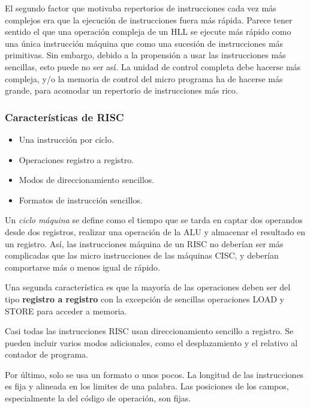 El segundo factor que motivaba repertorios de instrucciones cada vez más complejos era que la ejecución de instrucciones fuera más rápida. Parece tener sentido el que una operación compleja de un HLL se ejecute más rápido como una única instrucción máquina que como una sucesión de instrucciones más primitivas. Sin embargo, debido a la propensión a usar las instrucciones más sencillas, esto puede no ser así. La unidad de control completa debe hacerse más compleja, y/o la memoria de control del micro programa ha de hacerse más grande, para acomodar un repertorio de instrucciones más rico.

\subsubsection*{Características de RISC}

\begin{itemize}
  \item Una instrucción por ciclo.
  \item Operaciones registro a registro.
  \item Modos de direccionamiento sencillos.
  \item Formatos de instrucción sencillos.
\end{itemize}

Un \textit{ciclo máquina} se define como el tiempo que se tarda en captar dos operandos desde dos registros, realizar una operación de la ALU y almacenar el resultado en un registro. Así, las instrucciones máquina de un RISC no deberían ser más complicadas que las micro instrucciones de las máquinas CISC, y deberían comportarse más o menos igual de rápido.

Una segunda característica es que la mayoría de las operaciones deben ser del tipo \textbf{registro a registro} con la excepción de sencillas operaciones LOAD y STORE para acceder a memoria. 

Casi todas las instrucciones RISC usan direccionamiento sencillo a registro. Se pueden incluir varios modos adicionales, como el desplazamiento y el relativo al contador de programa. 

Por último, solo se usa un formato o unos pocos. La longitud de las instrucciones es fija y alineada en los limites de una palabra. Las posiciones de los campos, especialmente la del código de operación, son fijas.
